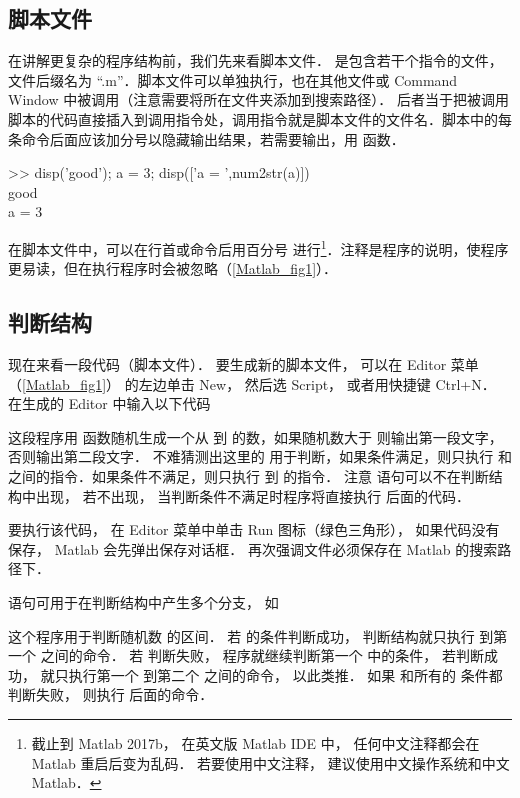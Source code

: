 

\subsection{脚本文件}
在讲解更复杂的程序结构前，我们先来看脚本文件． 是包含若干个指令的文件，文件后缀名为 “.m”．脚本文件可以单独执行，也在其他文件或 Command Window 中被调用（注意需要将所在文件夹添加到搜索路径）． 后者当于把被调用脚本的代码直接插入到调用指令处，调用指令就是脚本文件的文件名．脚本中的每条命令后面应该加分号以隐藏输出结果，若需要输出，用  函数．
\begin{Command}
>> disp({\color{string}'good'}); a = 3; disp([{\color{string}'a = '},num2str(a)]) \\
good \\
a = 3
\end{Command}
在脚本文件中，可以在行首或命令后用百分号 \x{\%} 进行\footnote{截止到 Matlab 2017b， 在英文版 Matlab IDE 中， 任何中文注释都会在 Matlab 重启后变为乱码． 若要使用中文注释， 建议使用中文操作系统和中文 Matlab．}．注释是程序的说明，使程序更易读，但在执行程序时会被忽略（\autoref{Matlab_fig1}）．

\subsection{判断结构}
现在来看一段代码（脚本文件）． 要生成新的脚本文件， 可以在 Editor 菜单（\autoref{Matlab_fig1}） 的左边单击 New， 然后选 Script， 或者用快捷键 Ctrl+N． 在生成的 Editor 中输入以下代码

这段程序用  函数随机生成一个从  到  的数，如果随机数大于  则输出第一段文字，否则输出第二段文字． 不难猜测出这里的  用于判断，如果条件满足，则只执行  和  之间的指令．如果条件不满足，则只执行  到  的指令． 注意  语句可以不在判断结构中出现， 若不出现， 当判断条件不满足时程序将直接执行  后面的代码．

要执行该代码， 在 Editor 菜单中单击 Run 图标（绿色三角形）， 如果代码没有保存， Matlab 会先弹出保存对话框． 再次强调文件必须保存在 Matlab 的搜索路径下．

 语句可用于在判断结构中产生多个分支， 如

这个程序用于判断随机数  的区间． 若  的条件判断成功， 判断结构就只执行  到第一个  之间的命令． 若  判断失败， 程序就继续判断第一个  中的条件， 若判断成功， 就只执行第一个  到第二个  之间的命令， 以此类推． 如果  和所有的  条件都判断失败， 则执行  后面的命令．

